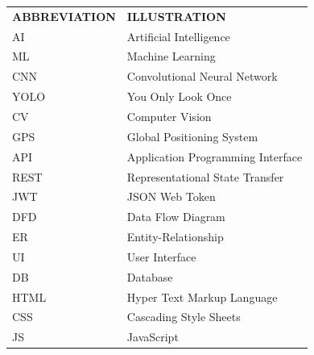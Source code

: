 \begin{center}

\renewcommand{\arraystretch}{1.5}

\begin{tabular}{p{4cm} p{8cm}}

\textbf{ABBREVIATION} &
\textbf{ILLUSTRATION}
\\[0.5cm]

AI & Artificial Intelligence \\

ML & Machine Learning \\

CNN & Convolutional Neural Network \\

YOLO & You Only Look Once \\

CV & Computer Vision \\

GPS & Global Positioning System \\

API & Application Programming Interface \\

REST & Representational State Transfer \\

JWT & JSON Web Token \\

DFD & Data Flow Diagram \\

ER & Entity-Relationship \\

UI & User Interface \\

DB & Database \\

HTML & Hyper Text Markup Language \\

CSS & Cascading Style Sheets \\

JS & JavaScript \\

\end{tabular}

\end{center}

\clearpage


\newpage %
